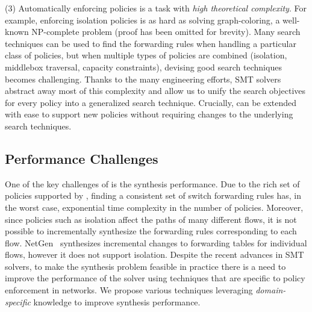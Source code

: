 (3) Automatically enforcing policies is a task with
\emph{high theoretical complexity}. 
For example, enforcing isolation policies
is as hard as solving
graph-coloring, a well-known
NP-complete problem (proof has been omitted for brevity).
Many search techniques can be used to find the forwarding rules when
handling a particular class of policies, but when multiple types of
policies are combined (isolation, middlebox traversal, capacity
constraints), devising good search techniques becomes challenging.
Thanks to the many engineering efforts, SMT solvers abstract away most
of this complexity and allow us to unify the search objectives for
every policy into a generalized search technique.
Crucially, \Name can be extended with ease to
support new policies without requiring changes to the underlying search
techniques.

\subsection{Performance Challenges} \label{sec:performance}

One of the key challenges of \Name is the synthesis
performance. 
Due to the rich set of policies supported by \Name,
finding a consistent set of switch forwarding rules 
has, in the worst case, exponential time complexity in
the number of policies.
Moreover, since policies such as isolation affect
the paths of many different flows, it is not possible to incrementally synthesize
the forwarding rules corresponding to each flow. NetGen~\cite{netgen}
synthesizes incremental changes to forwarding tables for individual
flows, however 
it does not support isolation.
Despite the recent advances in SMT solvers, to make
the synthesis problem feasible in practice
there is a need to improve the performance of the solver
using techniques that are specific to policy enforcement in networks.
We propose various techniques leveraging
\emph{domain-specific} knowledge to improve synthesis performance. 

